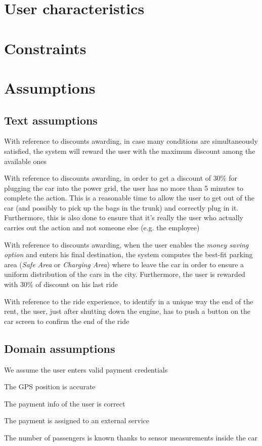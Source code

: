 \documentclass[11pt,a4paper]{report}
\begin{document}
\section{User characteristics}
\section{Constraints}
\section{Assumptions}
\subsection{Text assumptions}
\begin{TA}
	\item With reference to discounts awarding, in case many conditions are simultaneously satisfied, the system will reward the user with the maximum discount among the available ones
	\item With reference to discounts awarding, in order to get a discount of 30\% for plugging the car into the power grid, the user has no more than 5 minutes to complete the action. This is a reasonable time to allow the user to get out of the car (and possibly to pick up the bags in the trunk) and correctly plug in it. Furthermore, this is also done to ensure that it's really the user who actually carries out the action and not someone else (e.g. the employee)
	\item With reference to discounts awarding, when the user enables the \textit{money saving option} and enters his final destination, the system computes the best-fit parking area (\textit{Safe Area} or \textit{Charging Area}) where to leave the car in order to ensure a uniform distribution of the cars in the city. Furthermore, the user is rewarded with 30\% of discount on his last ride
	\item With reference to the ride experience, to identify in a unique way the end of the rent, the user, just after shutting down the engine, has to push a button on the car screen to confirm the end of the ride
\end{TA}
\subsection{Domain assumptions}
\begin{DA}
	\item We assume the user enters valid payment credentials
	\item The GPS position is accurate
	\item The payment info of the user is correct
	\item The payment is assigned to an external service
	\item The number of passengers is known thanks to sensor measurements inside the car
\end{DA}
\end{document}
